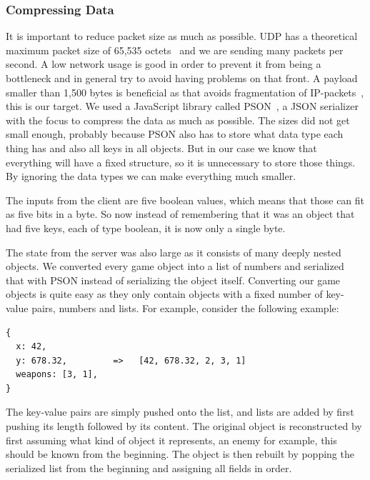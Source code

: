 \documentclass[a4paper]{article}
\begin{document}
\subsubsection{Compressing Data}\label{sec:compressing}
It is important to reduce packet size as much as possible. UDP has a theoretical maximum packet size of 65,535 octets~\cite{rfc768} and we are sending many packets per second. A low network usage is good in order to prevent it from being a bottleneck and in general try to avoid having problems on that front. A payload smaller than 1,500 bytes is beneficial as that avoids fragmentation of IP-packets~\cite{rfc894}, this is our target. We used a JavaScript library called PSON~\cite{web:pson}, a JSON serializer with the focus to compress the data as much as possible. The sizes did not get small enough, probably because PSON also has to store what data type each thing has and also all keys in all objects. But in our case we know that everything will have a fixed structure, so it is unnecessary to store those things. By ignoring the data types we can make everything much smaller.

The inputs from the client are five boolean values, which means that those can fit as five bits in a byte. So now instead of remembering that it was an object that had five keys, each of type boolean, it is now only a single byte.

The state from the server was also large as it consists of many deeply nested objects. We converted every game object into a list of numbers and serialized that with PSON instead of serializing the object itself. Converting our game objects is quite easy as they only contain objects with a fixed number of key-value pairs, numbers and lists. For example, consider the following example:
\begin{center}
\begin{BVerbatim}
{
  x: 42,
  y: 678.32,         =>   [42, 678.32, 2, 3, 1]
  weapons: [3, 1],
}
\end{BVerbatim}
\end{center}
The key-value pairs are simply pushed onto the list, and lists are added by first pushing its length followed by its content. The original object is reconstructed by first assuming what kind of object it represents, an enemy for example, this should be known from the beginning. The object is then rebuilt by popping the serialized list from the beginning and assigning all fields in order.
\end{document}
